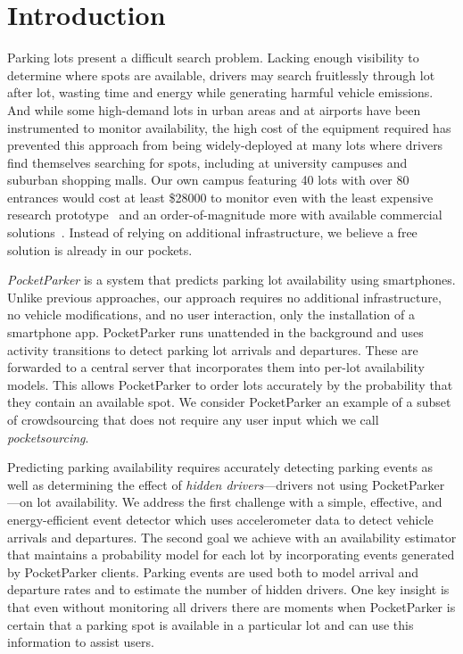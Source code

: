 \section{Introduction}

Parking lots present a difficult search problem. Lacking enough visibility to
determine where spots are available, drivers may search fruitlessly through
lot after lot, wasting time and energy while generating harmful vehicle
emissions. And while some high-demand lots in urban areas and at airports
have been instrumented to monitor availability, the high cost of the
equipment required has prevented this approach from being widely-deployed at
many lots where drivers find themselves searching for spots, including at
university campuses and suburban shopping malls. Our own campus featuring 40
lots with over 80 entrances would cost at least \$\num{28000} to monitor even
with the least expensive research prototype~\cite{propst2012embedded} and an
order-of-magnitude more with available commercial
solutions~\cite{car-detect}. Instead of relying on additional infrastructure,
we believe a free solution is already in our pockets.

\textit{PocketParker} is a system that predicts parking lot availability
using smartphones. Unlike previous approaches, our approach requires no
additional infrastructure, no vehicle modifications, and no user interaction,
only the installation of a smartphone app. PocketParker runs unattended in
the background and uses activity transitions to detect parking lot arrivals
and departures. These are forwarded to a central server that incorporates
them into per-lot availability models. This allows PocketParker to order lots
accurately by the probability that they contain an available spot. We
consider PocketParker an example of a subset of crowdsourcing that does not
require any user input which we call \textit{pocketsourcing}.

Predicting parking availability requires accurately detecting parking events
as well as determining the effect of \textit{hidden drivers}---drivers not
using PocketParker---on lot availability. We address the first challenge with
a simple, effective, and energy-efficient event detector which uses
accelerometer data to detect vehicle arrivals and departures. The second goal
we achieve with an availability estimator that maintains a probability model
for each lot by incorporating events generated by PocketParker clients.
Parking events are used both to model arrival and departure rates and to
estimate the number of hidden drivers. One key insight is that even without
monitoring all drivers there are moments when PocketParker is certain that a
parking spot is available in a particular lot and can use this information to
assist users.

